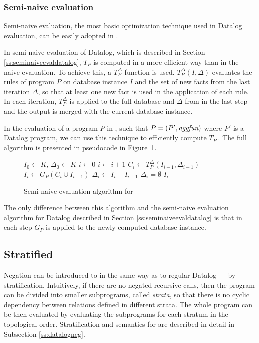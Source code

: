 \subsubsection{Semi-naive evaluation} Semi-naive evaluation, the most basic optimization technique used in Datalog evaluation, can be easily adopted in \datalogra.

In semi-naive evaluation of Datalog, which is described in Section \ref{ss:seminaiveevaldatalog}, $T_P$ is computed in a more efficient way than in the naive evaluation. To achieve this, a $T^\Delta_P$ function is used. $T_P^\Delta(I, \Delta)$ evaluates the rules of program $P$ on database instance $I$ and the set of new facts from the last iteration $\Delta$, so that at least one new fact is used in the application of each rule. In each iteration, $T^\Delta_P$ is applied to the full database and $\Delta$ from in the last step and the output is merged with the current database instance.

In the evaluation of a program $P$ in \datalogra, such that $P = (P', \textit{aggfun})$ where $P'$ is a Datalog program, we can use this technique to efficiently compute $T_{P'}$. The full algorithm is presented in pseudocode in Figure~\ref{psc:seminaiveevaldatalogra}.

\begin{figure}[!htbp]
\begin{codebox}
  \li $I_0 \leftarrow K$, $\Delta_0 \leftarrow K$
  \li $i \leftarrow 0$
  \li \Repeat
	\li $i \leftarrow i + 1$
	\li $C_i \leftarrow T_P^\Delta(I_{i-1}, \Delta_{i-1})$
	\li $I_i \leftarrow G_P(C_i \cup I_{i-1})$
	\li $\Delta_i \leftarrow I_i - I_{i-1}$
  \li \Until $\Delta_i = \emptyset$
  \li \Return $I_i$
\end{codebox}
\caption{Semi-naive evaluation algorithm for \datalogra}\label{psc:seminaiveevaldatalogra}
\end{figure}


The only difference between this algorithm and the semi-naive evaluation algorithm for Datalog described in Section \ref{ss:seminaiveevaldatalog} is that in each step $G_P$ is applied to the newly computed database instance.

\subsection{Stratified \datalogra}
Negation can be introduced to \datalogra in the same way as to regular Datalog --- by stratification. Intuitively, if there are no negated recursive calls, then the program can be divided into smaller subprograms, called \emph{strata}, so that there is no cyclic dependency between relations defined in different strata. The whole program can be then evaluated by evaluating the subprograms for each stratum in the topological order. Stratification and semantics for \datalogneg are described in detail in Subsection \ref{ss:datalogneg}.

